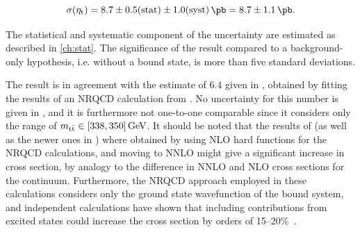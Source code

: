 \begin{equation}
\label{eq:ah:result_etatxs}
    \sigetat = 8.7 \pm 0.5 (\text{stat}) \pm 1.0 (\text{syst}) \, \si{\pb} = 8.7 \pm 1.1  \, \si{\pb}.
\end{equation}

The statistical and systematic component of the uncertainty are estimated as described in \cref{ch:stat}. The significance of the result compared to a background-only hypothesis, i.e. without a bound state, is more than five standard deviations.

The result is in agreement with the estimate of \SI{6.4}{\pb} given in , obtained by fitting the results of an NRQCD calculation from . No uncertainty for this number is given in , and it is furthermore not one-to-one comparable since it considers only the range of $\mtt \in [338, 350] \, \si{\GeV}$. It should be noted that the results of  (as well as the newer ones in )  where obtained by using NLO hard functions for the NRQCD calculations, and moving to NNLO might give a significant increase in cross section, by analogy to the difference in NNLO and NLO cross sections for the \ttbar continuum. Furthermore, the NRQCD approach employed in these calculations considers only the ground state wavefunction of the bound \ttbar system, and independent calculations have shown that including contributions from excited states could increase the cross section by orders of 15--20\%~\cite{Llanes-Estrada:2024phk,dEnterria:2025ecx}.

